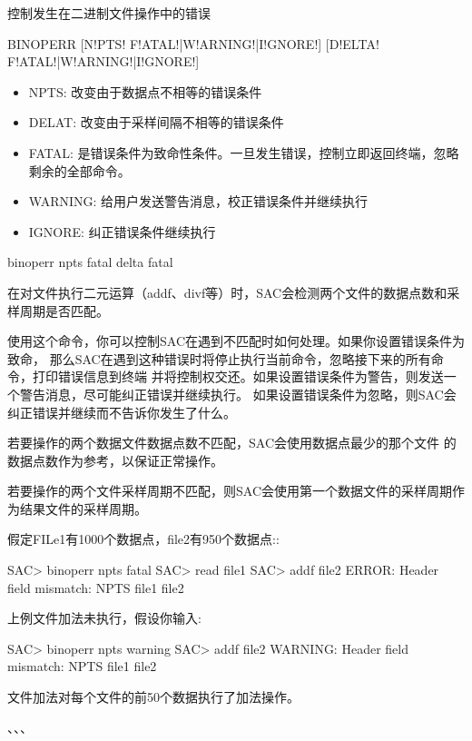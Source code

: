 \label{cmd:binoperr}

控制发生在二进制文件操作中的错误

\begin{SACSTX}
BINOPERR [N!PTS! F!ATAL!|W!ARNING!|I!GNORE!] [D!ELTA! F!ATAL!|W!ARNING!|I!GNORE!]
\end{SACSTX}

\begin{itemize}
\item NPTS: 改变由于数据点不相等的错误条件 
\item DELAT: 改变由于采样间隔不相等的错误条件 
\item FATAL: 是错误条件为致命性条件。一旦发生错误，控制立即返回终端，忽略剩余的全部命令。
\item WARNING: 给用户发送警告消息，校正错误条件并继续执行
\item IGNORE: 纠正错误条件继续执行
\end{itemize}

\begin{SACDFT}
binoperr npts fatal delta fatal
\end{SACDFT}

在对文件执行二元运算（addf、divf等）时，SAC会检测两个文件的数据点数和采样周期是否匹配。

使用这个命令，你可以控制SAC在遇到不匹配时如何处理。如果你设置错误条件为致命，
那么SAC在遇到这种错误时将停止执行当前命令，忽略接下来的所有命令，打印错误信息到终端
并将控制权交还。如果设置错误条件为警告，则发送一个警告消息，尽可能纠正错误并继续执行。
如果设置错误条件为忽略，则SAC会纠正错误并继续而不告诉你发生了什么。

若要操作的两个数据文件数据点数不匹配，SAC会使用数据点最少的那个文件
的数据点数作为参考，以保证正常操作。

若要操作的两个文件采样周期不匹配，则SAC会使用第一个数据文件的采样周期作为结果文件的采样周期。

假定FILe1有1000个数据点，file2有950个数据点::
\begin{SACCode}
SAC> binoperr npts fatal
SAC> read file1
SAC> addf file2
ERROR:  Header field mismatch: NPTS file1 file2
\end{SACCode}

上例文件加法未执行，假设你输入:
\begin{SACCode}
SAC> binoperr npts warning
SAC> addf file2
WARNING:  Header field mismatch: NPTS file1 file2
\end{SACCode}
文件加法对每个文件的前50个数据执行了加法操作。

、、、
